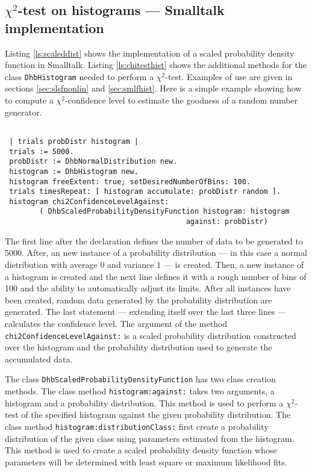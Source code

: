 \documentclass[twoside]{book}
\begin{document}
\subsection{$\chi^2$-test on histograms --- Smalltalk implementation}
 Listing
\ref{ls:scaleddist} shows the implementation of a scaled
probability density function in Smalltalk. Listing
\ref{ls:chitesthist} shows the additional methods for the class
{\tt DhbHistogram} needed to perform a $\chi^2$-test. Examples of
use are given in sections \ref{sec:slsfnonlin} and
\ref{sec:smlfhist}. Here is a simple example showing how to
compute a $\chi^2$-confidence level to estimate the goodness of a
random number generator.
\begin{codeExample}
\label{exs:chitest}
\begin{verbatim}

 | trials probDistr histogram |
 trials := 5000.
 probDistr := DhbNormalDistribution new.
 histogram := DhbHistogram new.
 histogram freeExtent: true; setDesiredNumberOfBins: 100.
 trials timesRepeat: [ histogram accumulate: probDistr random ].
 histogram chi2ConfidenceLevelAgainst:
        ( DhbScaledProbabilityDensityFunction histogram: histogram
                                          against: probDistr)
\end{verbatim}
\end{codeExample}
The first line after the declaration defines the number of data to
be generated to 5000. After, an new instance of a probability
distribution --- in this case a normal distribution with average 0
and variance 1 --- is created. Then, a new instance of a histogram
is created and the next line defines it with a rough number of
bins of 100 and the ability to automatically adjust its limits.
After all instances have been created, random data generated by
the probability distribution are generated. The last statement
--- extending itself over the last three lines --- calculates
the confidence level. The argument of the method {\tt
chi2ConfidenceLevelAgainst:} is a scaled probability distribution
constructed over the histogram and the probability distribution
used to generate the accumulated data.

The class {\tt DhbScaledProbabilityDensityFunction} has two class
creation methods. The class method {\tt histogram:against:} takes
two arguments, a histogram and a probability distribution. This
method is used to perform a $\chi^2$-test of the specified
histogram against the given probability distribution. The class
method {\tt histogram:distributionClass:} first create a
probability distribution of the given class using parameters
estimated from the histogram. This method is used to create a
scaled probability density function whose parameters will be
determined with least square or maximum likelihood fits.
\end{document}
